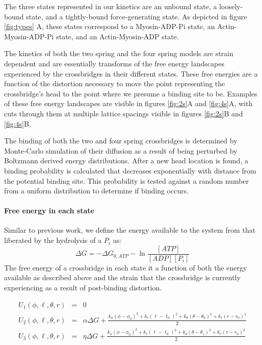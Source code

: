 \documentclass[]{article}
\begin{document}
The three states represented in our kinetics are an unbound state, a loosely-bound state, and a tightly-bound force-generating state.
As depicted in figure \ref{fig:types} A, these states correspond to a Myosin-ADP-Pi state, an Actin-Myosin-ADP-Pi state, and an Actin-Myosin-ADP state.

The kinetics of both the two spring and the four spring models are strain dependent and are essentially transforms of the free energy landscapes experienced by the crossbridges in their different states.
These free energies are a function of the distortion necessary to move the point representing the crossbridge's head to the point where we presume a binding site to be.
Examples of these free energy landscapes are visible in figures \ref{fig:2s}A and \ref{fig:4s}A, with cuts through them at multiple lattice spacings visible in figures \ref{fig:2s}B and \ref{fig:4s}B.

The binding of both the two and four spring crossbridges is determined by Monte-Carlo simulation of their diffusion as a result of being perturbed by Boltzmann derived energy distributions. 
After a new head location is found, a binding probability is calculated that decreases exponentially with distance from the potential binding site. 
This probability is tested against a random number from a uniform distribution to determine if binding occurs.

\paragraph{Free energy in each state} %
Similar to previous work, we define the energy available to the system from that liberated by the hydrolysis of a $P_i$ as: 
$$\Delta G = -\Delta G_{0,ATP} - \ln \frac{[ATP]}{[ADP] [P_i]}$$
The free energy of a crossbridge in each state it a function of both the energy available as described above and the strain that the crossbridge is currently experiencing as a result of post-binding distortion.


\begin{eqnarray}
\label{4sEnergy}
U_1(\phi,\ell,\theta,r) & = & 0 \nonumber \\
U_2(\phi,\ell,\theta,r) & = & \alpha \Delta G + \frac{k_\phi (\phi-\phi_0)^2 + k_\ell (\ell-\ell_0)^2 + k_\theta (\theta-\theta_0)^2 + k_r (r-r_0)^2}{2} \nonumber \\
U_3(\phi,\ell,\theta,r) & = & \eta \Delta G + \frac{k_\phi (\phi-\phi_0)^2 + k_\ell (\ell-\ell_0)^2 + k_\theta (\theta-\theta_1)^2 + k_r (r-r_0)^2}{2}
\end{eqnarray}
\end{document}
